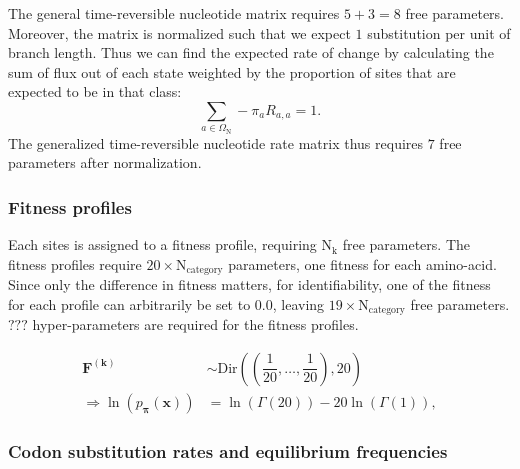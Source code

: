 \documentclass{article}
\newcommand{\site}{\text{k}}
\newcommand{\Nsite}{\text{N}_{\site}}
\newcommand{\SetNuc}{\Omega_{\mathrm{N}}}
\newcommand{\mutmatrix}{R}
\begin{document}
The general time-reversible nucleotide matrix requires $5+3 = 8$ free parameters. Moreover, the matrix is normalized such that we expect $1$ substitution per unit of branch length. Thus we can find the expected rate of change by calculating the sum of flux out of each state weighted by the proportion of sites that are expected to be in that class:
\begin{equation}
\sum_{a \in \SetNuc} - \pi_a \mutmatrix_{a,a} = 1.
\end{equation}
The generalized time-reversible nucleotide rate matrix thus requires $7$ free parameters after normalization.

\subsubsection{Fitness profiles}

Each sites is assigned to a fitness profile, requiring $\Nsite$ free parameters.
The fitness profiles require $20 \times \text{N}_{\text{category}} $ parameters, one fitness for each amino-acid.
Since only the difference in fitness matters, for identifiability, one of the fitness for each profile can arbitrarily be set to $0.0$, leaving $19 \times \text{N}_{\text{category}} $ free parameters.
$???$ hyper-parameters are required for the fitness profiles.

\begin{align}
\bm{F^{(\site)}} & \sim \mathrm{Dir}\left( \left( \dfrac{1}{20}, \hdots , \dfrac{1}{20} \right) , 20\right) \\
\Rightarrow \ln \left(p_{\bm{\pi}}\left(\bm{x}\right)\right) & = \ln \left(\Gamma(20)\right) - 20\ln\left(\Gamma(1)\right), 
\end{align}


\subsubsection{Codon substitution rates and equilibrium frequencies}
\end{document}
